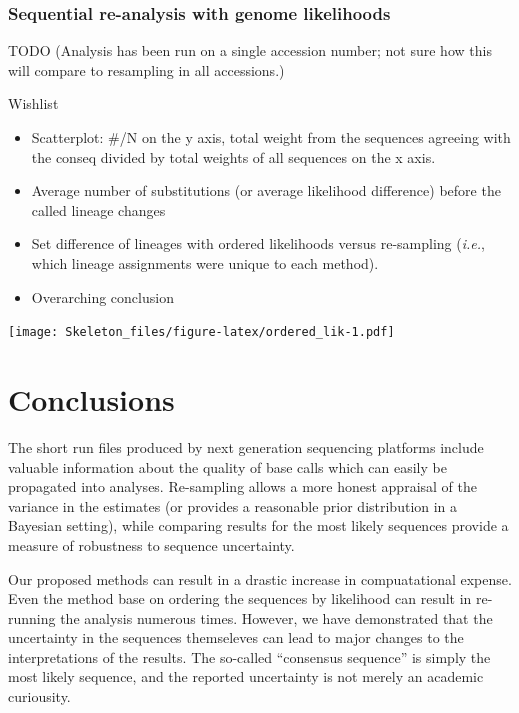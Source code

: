 \documentclass[
]{article}
\providecommand{\tightlist}{%
  \setlength{\itemsep}{0pt}\setlength{\parskip}{0pt}}
\newcommand{\ie}{\textit{i.e.},\xspace}
\begin{document}
\hypertarget{sequential-re-analysis-with-genome-likelihoods}{%
\subsubsection{Sequential re-analysis with genome
likelihoods}\label{sequential-re-analysis-with-genome-likelihoods}}

TODO (Analysis has been run on a single accession number; not sure how
this will compare to resampling in all accessions.)

Wishlist

\begin{itemize}
\tightlist
\item
  Scatterplot: \#/N on the y axis, total weight from the sequences
  agreeing with the conseq divided by total weights of all sequences on
  the x axis.
\item
  Average number of substitutions (or average likelihood difference)
  before the called lineage changes
\item
  Set difference of lineages with ordered likelihoods versus re-sampling
  (\ie which lineage assignments were unique to each method).
\item
  Overarching conclusion
\end{itemize}

\texttt{[image: Skeleton\_files/figure-latex/ordered\_lik-1.pdf]}

\hypertarget{conclusions}{%
\section{Conclusions}\label{conclusions}}

The short run files produced by next generation sequencing platforms
include valuable information about the quality of base calls which can
easily be propagated into analyses. Re-sampling allows a more honest
appraisal of the variance in the estimates (or provides a reasonable
prior distribution in a Bayesian setting), while comparing results for
the most likely sequences provide a measure of robustness to sequence
uncertainty.

Our proposed methods can result in a drastic increase in compuatational
expense. Even the method base on ordering the sequences by likelihood
can result in re-running the analysis numerous times. However, we have
demonstrated that the uncertainty in the sequences themseleves can lead
to major changes to the interpretations of the results. The so-called
``consensus sequence'' is simply the most likely sequence, and the
reported uncertainty is not merely an academic curiousity.
\end{document}
